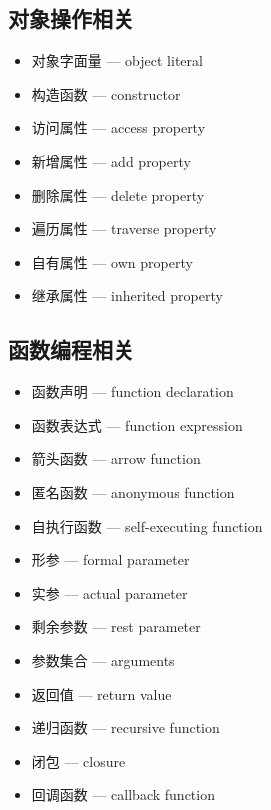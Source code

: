 \subsection{对象操作相关}
\begin{itemize}
\item 对象字面量 — object literal
\item 构造函数 — constructor
\item 访问属性 — access property
\item 新增属性 — add property
\item 删除属性 — delete property
\item 遍历属性 — traverse property
\item 自有属性 — own property
\item 继承属性 — inherited property
\end{itemize}

\subsection{函数编程相关}
\begin{itemize}
\item 函数声明 — function declaration
\item 函数表达式 — function expression
\item 箭头函数 — arrow function
\item 匿名函数 — anonymous function
\item 自执行函数 — self-executing function
\item 形参 — formal parameter
\item 实参 — actual parameter
\item 剩余参数 — rest parameter
\item 参数集合 — arguments
\item 返回值 — return value
\item 递归函数 — recursive function
\item 闭包 — closure
\item 回调函数 — callback function
\end{itemize}

